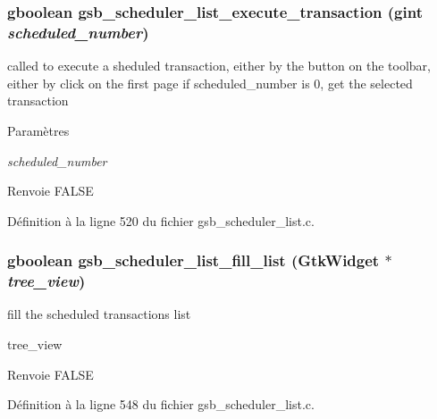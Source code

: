 \subsubsection[{gsb\_\-scheduler\_\-list\_\-execute\_\-transaction}]{\setlength{\rightskip}{0pt plus 5cm}gboolean gsb\_\-scheduler\_\-list\_\-execute\_\-transaction (gint {\em scheduled\_\-number})}\label{gsb__scheduler__list_8h_aecc0e9467fcae670ba2243053ce56334}
called to execute a sheduled transaction, either by the button on the toolbar, either by click on the first page if scheduled\_\-number is 0, get the selected transaction


\begin{DoxyParams}{Paramètres}
\item[{\em scheduled\_\-number}]\end{DoxyParams}
\begin{DoxyReturn}{Renvoie}
FALSE 
\end{DoxyReturn}


Définition à la ligne 520 du fichier gsb\_\-scheduler\_\-list.c.

\subsubsection[{gsb\_\-scheduler\_\-list\_\-fill\_\-list}]{\setlength{\rightskip}{0pt plus 5cm}gboolean gsb\_\-scheduler\_\-list\_\-fill\_\-list (GtkWidget $\ast$ {\em tree\_\-view})}\label{gsb__scheduler__list_8h_a09e95845b5893d975e94605f02051651}
fill the scheduled transactions list

tree\_\-view

\begin{DoxyReturn}{Renvoie}
FALSE 
\end{DoxyReturn}


Définition à la ligne 548 du fichier gsb\_\-scheduler\_\-list.c.

